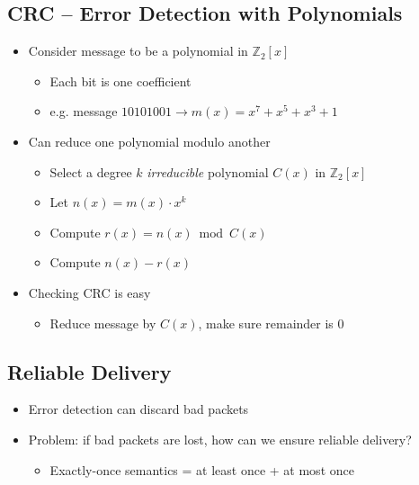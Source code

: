 \subsection{CRC -- Error Detection with Polynomials}
\begin{itemize}[nosep]
    \item Consider message to be a polynomial in $\mathbb{Z}_2[x]$
          \begin{itemize}[nosep]
              \item Each bit is one coefficient
              \item e.g. message $10101001 \to m(x) = x^7 + x^5 + x^3 + 1$
          \end{itemize}
    \item Can reduce one polynomial modulo another
          \begin{itemize}[nosep]
              \item Select a degree $k$ \emph{irreducible} polynomial $C(x)$ in $\mathbb{Z}_2[x]$
              \item Let $n(x) = m(x)\cdot x^k$
              \item Compute $r(x) = n(x) \bmod C(x)$
              \item Compute $n(x) - r(x)$
          \end{itemize}
    \item Checking CRC is easy
          \begin{itemize}[nosep]
              \item Reduce message by $C(x)$, make sure remainder is 0
          \end{itemize}
\end{itemize}
\subsection{Reliable Delivery}
\begin{itemize}[nosep]
    \item Error detection can discard bad packets
    \item Problem: if bad packets are lost, how can we ensure reliable delivery?
          \begin{itemize}[nosep]
              \item Exactly-once semantics = at least once + at most once
          \end{itemize}
\end{itemize}


